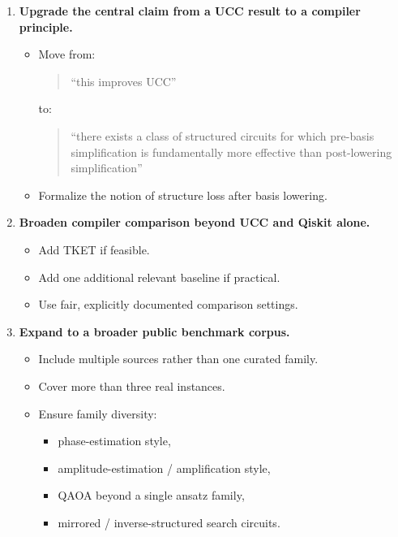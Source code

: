 \documentclass[11pt]{article}
\begin{document}
\begin{enumerate}
    \item \textbf{Upgrade the central claim from a UCC result to a compiler principle.}
    \begin{itemize}
        \item Move from:
        \begin{quote}
        ``this improves UCC''
        \end{quote}
        to:
        \begin{quote}
        ``there exists a class of structured circuits for which pre-basis simplification is fundamentally more effective than post-lowering simplification''
        \end{quote}
        \item Formalize the notion of structure loss after basis lowering.
    \end{itemize}

    \item \textbf{Broaden compiler comparison beyond UCC and Qiskit alone.}
    \begin{itemize}
        \item Add TKET if feasible.
        \item Add one additional relevant baseline if practical.
        \item Use fair, explicitly documented comparison settings.
    \end{itemize}

    \item \textbf{Expand to a broader public benchmark corpus.}
    \begin{itemize}
        \item Include multiple sources rather than one curated family.
        \item Cover more than three real instances.
        \item Ensure family diversity:
        \begin{itemize}
            \item phase-estimation style,
            \item amplitude-estimation / amplification style,
            \item QAOA beyond a single ansatz family,
            \item mirrored / inverse-structured search circuits.
        \end{itemize}
    \end{itemize}


\end{enumerate}
\end{document}
